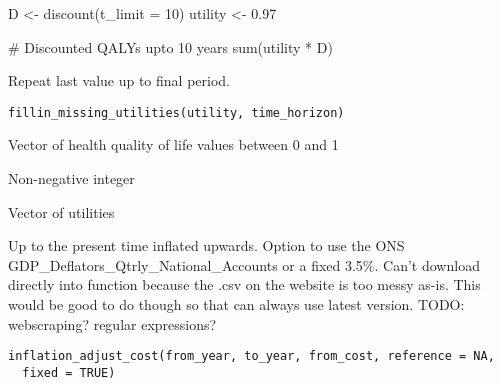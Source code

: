 \documentclass[a4paper]{book}
\begin{document}
%
\begin{Examples}
\begin{ExampleCode}

D <- discount(t_limit = 10)
utility <- 0.97

# Discounted QALYs upto 10 years
sum(utility * D)

\end{ExampleCode}
\end{Examples}
%
\begin{Description}\relax
Repeat last value up to final period.
\end{Description}
%
\begin{Usage}
\begin{verbatim}
fillin_missing_utilities(utility, time_horizon)
\end{verbatim}
\end{Usage}
%
\begin{Arguments}
\begin{ldescription}
\item[\code{utility}] Vector of health quality of life values between 0 and 1

\item[\code{time\_horizon}] Non-negative integer
\end{ldescription}
\end{Arguments}
%
\begin{Value}
Vector of utilities
\end{Value}
%
\begin{SeeAlso}\relax
{}
\end{SeeAlso}
%
\begin{Description}\relax
Up to the present time inflated upwards.
Option to use the ONS GDP\_Deflators\_Qtrly\_National\_Accounts or
a fixed 3.5\%.
Can't download directly into function because the .csv on the website is too messy as-is.
This would be good to do though so that can always use latest version.
TODO: webscraping? regular expressions?
\end{Description}
%
\begin{Usage}
\begin{verbatim}
inflation_adjust_cost(from_year, to_year, from_cost, reference = NA,
  fixed = TRUE)
\end{verbatim}
\end{Usage}
\end{document}
